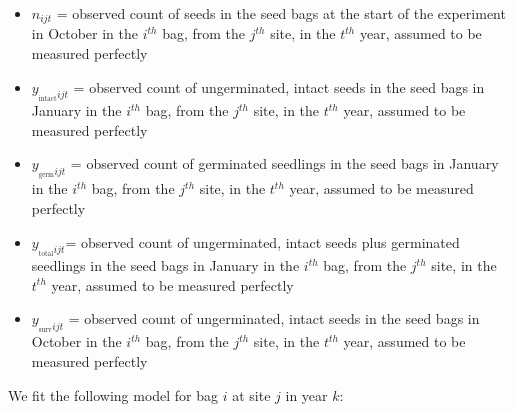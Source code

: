 \documentclass[12pt, oneside, titlepage]{article}   	%
\begin{document}
\begin{itemize}
	\item $n_{ijt}$ = observed count of seeds in the seed bags at the start of the experiment in October in the $i^{th}$ bag, from the $j^{th}$ site, in the $t^{th}$ year, assumed to be measured perfectly 
	\item $y_{_{\mathrm{intact}} ijt}$ = observed count of ungerminated, intact seeds in the seed bags in January in the $i^{th}$ bag, from the $j^{th}$ site, in the $t^{th}$ year,  assumed to be measured perfectly 
	\item $y_{_{\mathrm{germ}} ijt}$ = observed count of germinated seedlings in the seed bags in January in the $i^{th}$ bag, from the $j^{th}$ site, in the $t^{th}$ year, assumed to be measured perfectly 
	\item $y_{_{\mathrm{total}} ijt}$= observed count of ungerminated, intact seeds plus germinated seedlings in the seed bags in January in the $i^{th}$ bag, from the $j^{th}$ site, in the $t^{th}$ year, assumed to be measured perfectly 	
	\item $y_{_{\mathrm{surv}} ijt}$ = observed count of ungerminated, intact seeds in the seed bags in October in the $i^{th}$ bag, from the $j^{th}$ site, in the $t^{th}$ year, assumed to be measured perfectly 	
\end{itemize}

We fit the following model for bag $i$ at site $j$ in year $k$:
\end{document}
